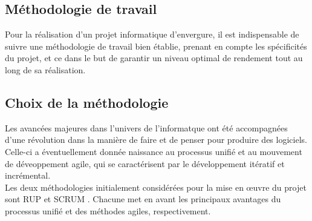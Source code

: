 \begin{spacing}{1.5}
\section{Méthodologie de travail}
Pour la réalisation d'un projet informatique d'envergure, il est indispensable de suivre une méthodologie de travail bien établie, prenant en compte les spécificités du projet, et ce dans le but de garantir un niveau optimal de rendement tout au long de sa réalisation.
\subsection{Choix de la méthodologie}
Les avancées majeures dans l'univers de l'informatque ont été accompagnées d'une révolution dans la manière de faire et de penser pour produire des logiciels. Celle-ci a éventuellement donnée naissance au processus unifié et au mouvement de déveoppement agile, qui se caractérisent par le développement itératif et incrémental.\\
Les deux méthodologies initialement considérées pour la mise en œuvre du projet sont RUP \cite{RUP} et SCRUM \cite{SCRUM}. Chacune met en avant les principaux avantages du processus unifié et des méthodes agiles, respectivement.\\


\end{spacing}
